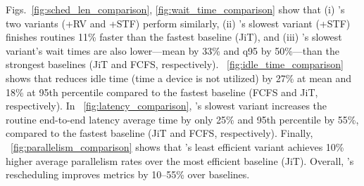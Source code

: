 Figs.~\ref{fig:sched_len_comparison}, \ref{fig:wait_time_comparison} show that 
(i) \sysname's two variants (\scheduler+RV and \scheduler+STF) perform similarly,
(ii) \sysname's slowest variant (\scheduler+STF) finishes routines 11\% faster than the fastest baseline (JiT), and
(iii) \sysname's slowest variant's wait times are also lower---mean by 33\% and q95 by 50\%---than the strongest baselines (JiT and FCFS, respectively). 
\Figure~\ref{fig:idle_time_comparison} shows that \sysname{} reduces idle time (time a device is not utilized) by 27\% at mean and 18\% at 95th percentile compared to the fastest baseline (FCFS and JiT, respectively).
In \Figure~\ref{fig:latency_comparison}, \sysname{}'s slowest variant increases the routine end-to-end latency average time by only 25\% and 95th percentile by 55\%, compared to the fastest baseline (JiT and FCFS, respectively).
Finally, \Figure~\ref{fig:parallelism_comparison} shows that \sysname{}'s least efficient variant achieves 10\% higher average parallelism rates over the most efficient baseline (JiT). 
Overall, \sysname's rescheduling improves metrics by 10–55\% over baselines.
